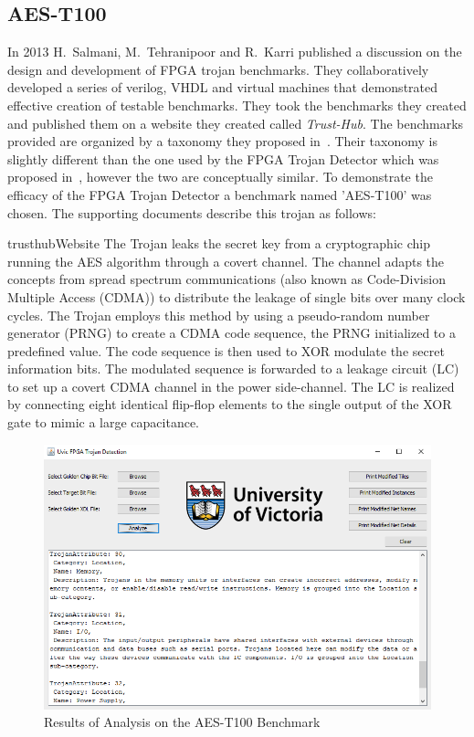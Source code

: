 \documentclass[journal, hidelinks]{IEEEtran}
\begin{document}
\subsection{AES-T100} \label{sec:aesT100}
In 2013 H.~Salmani, M.~Tehranipoor and R.~Karri published a discussion on the design and development of FPGA trojan benchmarks.
They collaboratively developed a series of verilog, VHDL and virtual machines that demonstrated effective creation of testable benchmarks.
They took the benchmarks they created and published them on a website they created called \textit{Trust-Hub}.
The benchmarks provided are organized by a taxonomy they proposed in~\cite{trustHubPaper}.
Their taxonomy is slightly different than the one used by the FPGA Trojan Detector which was proposed in~\cite{samerAttribute}, however the two are conceptually similar.
To demonstrate the efficacy of the FPGA Trojan Detector a benchmark named 'AES-T100' was chosen. 
The supporting documents describe this trojan as follows:
\begin{displaycquote}{trusthubWebsite}
	The Trojan leaks the secret key from a cryptographic chip running the AES algorithm through a covert channel. The channel adapts the concepts from spread spectrum communications (also known as Code-Division Multiple Access (CDMA)) to distribute the leakage of single bits over many clock cycles. The Trojan employs this method by using a pseudo-random number generator (PRNG) to create a CDMA code sequence, the PRNG initialized to a predefined value. The code sequence is then used to XOR modulate the secret information bits. The modulated sequence is forwarded to a leakage circuit (LC) to set up a covert CDMA channel in the power side-channel. The LC is realized by connecting eight identical flip-flop elements to the single output of the XOR gate to mimic a large capacitance.
\end{displaycquote}
\begin{figure}[t]
	\centering
	\includegraphics[width=0.7\linewidth]{Figures/aesResult}
	\caption[Results of Analysis on the AES-T100 Benchmark]{Results of Analysis on the AES-T100 Benchmark}
	\label{fig:aesResult}
\end{figure}
\end{document}
